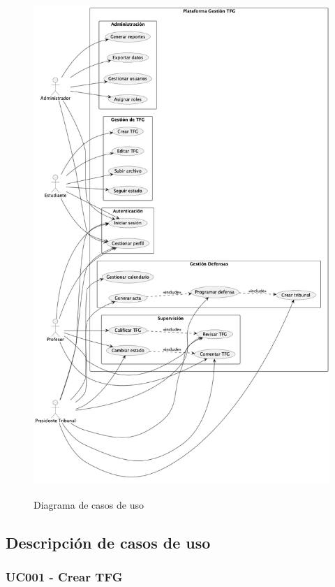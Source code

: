 \documentclass[12pt,a4paper,oneside]{report}
\providecommand{\pandocbounded}[1]{#1}
\begin{document}
\begin{figure}
\centering
\pandocbounded{\includegraphics[keepaspectratio,alt={Diagrama de casos de uso}]{processed/images/04_analisis_sistema_plantuml_0.png}}
\caption{Diagrama de casos de uso}
\end{figure}

\subsection{Descripción de casos de
uso}\label{descripciuxf3n-de-casos-de-uso}

\subsubsection{UC001 - Crear TFG}\label{uc001---crear-tfg}
\end{document}
